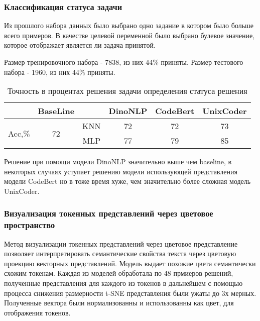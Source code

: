 \documentclass[../part_3.tex]{subfiles}
\begin{document}
\subsubsection{Классификация статуса задачи}
\par Из прошлого набора данных было выбрано одно задание в котором было больше всего примеров. В качестве целевой переменной было выбрано булевое значение, которое отображает является ли задача принятой. 
\par Размер тренировочного набора - 7838, из них 44\% приняты. Размер тестового набора - 1960, из них 44\% приняты. 
\begin{table}[H]
    \centering
    \begin{tabular}{|c|c||c|c|c|c|}\hline 
        &BaseLine&&DinoNLP&CodeBert&UnixCoder\\ \hline 
        \multirow{2}{*}{Acc,\%}&\multirow{2}{*}{72}&KNN&72&72&73\\\cline{3-6}
        &&MLP&77&79&85\\\hline
    \end{tabular}    
    \caption{Точность в процентах решения задачи определения статуса решения}
\end{table}
\par Решение при помощи модели DinoNLP значительно выше чем baseline, в некоторых случаях уступает решению модели использующей представления модели CodeBert но в тоже время хуже, чем значительно более сложная модель UnixCoder. %
\subsubsection{Визуализация токенных представлений через цветовое пространство}
\par Метод визуализации токенных представлений через цветовое представление позволяет интерпретировать семантические свойства текста через цветовую проекцию векторных представлений. Модель выдает похожие цвета семантически схожим токенам. Каждая из моделей обработала по 48 прмиеров решений, полученные представления для каждого из токенов в дальнейшем с помощью процесса снижения размерности t-SNE\cite{tsne} представления были ужаты до 3х мерных. Полученные вектора были нормализованны и использованны как цвет, для отображения токенов.
\end{document}
